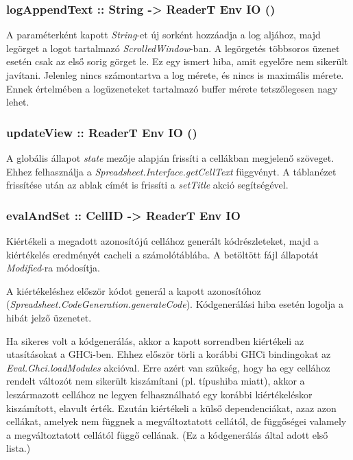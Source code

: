 \subsubsection{logAppendText :: String -> ReaderT Env IO ()}

A paraméterként kapott \textit{String}-et új sorként hozzáadja a log aljához, majd legörget a logot tartalmazó \textit{ScrolledWindow}-ban. A legörgetés többsoros üzenet esetén csak az első sorig görget le. Ez egy ismert hiba, amit egyelőre nem sikerült javítani. Jelenleg nincs számontartva a log mérete, és nincs is maximális mérete. Ennek értelmében a logüzeneteket tartalmazó buffer mérete tetszőlegesen nagy lehet.

\subsubsection{updateView :: ReaderT Env IO ()}

A globális állapot \textit{state} mezője alapján frissíti a cellákban megjelenő szöveget. Ehhez felhasználja a \textit{Spreadsheet.Interface.getCellText} függvényt. A táblanézet frissítése után az ablak címét is frissíti a \textit{setTitle} akció segítségével.

\subsubsection{evalAndSet :: CellID -> ReaderT Env IO}

Kiértékeli a megadott azonosítójú cellához generált kódrészleteket, majd a kiértékelés eredményét cacheli a számolótáblába. A betöltött fájl állapotát \textit{Modified}-ra módosítja.

A kiértékeléshez először kódot generál a kapott azonosítóhoz \mbox{(\textit{Spreadsheet.CodeGeneration.generateCode})}. Kódgenerálási hiba esetén logolja a hibát jelző üzenetet. 

Ha sikeres volt a kódgenerálás, akkor a kapott sorrendben kiértékeli az utasításokat a GHCi-ben. Ehhez először törli a korábbi GHCi bindingokat az \textit{Eval.Ghci.loadModules} akcióval. Erre azért van szükség, hogy ha egy cellához rendelt változót nem sikerült kiszámítani (pl. típushiba miatt), akkor a leszármazott cellához ne legyen felhasználható egy korábbi kiértékeléskor kiszámított, elavult érték. Ezután kiértékeli a külső dependenciákat, azaz azon cellákat, amelyek nem függnek a megváltoztatott cellától, de függőségei valamely  a megváltoztatott cellától függő cellának. (Ez a kódgenerálás által adott első lista.)


